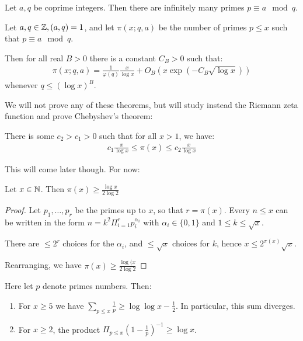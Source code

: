 \documentclass[10pt,a4paper]{article}
\begin{document}
\begin{theorem}
Let $a,q$ be coprime integers. Then there are infinitely many primes $p \equiv a \mod q$.
\end{theorem}
\begin{theorem}
Let $a,q \in \mathbb{Z}, (a,q)=1$, and let $\pi(x;q,a)$ be the number of primes $p \leq x$ such that $p \equiv a \mod q$. 

Then for all real $B>0$ there is a constant $C_B>0$ such that:
\begin{align*}
\pi(x;q,a) = \frac{1}{\varphi(q)}\frac{x}{\log x}+O_B(x \exp(-C_B\sqrt{\log x}))
\end{align*}
whenever $q \leq (\log x)^B$.
\end{theorem}
We will not prove any of these theorems, but will study instead the Riemann zeta function and prove Chebyshev's theorem:
\begin{theorem}[Chebyshev]
There is some $c_2>c_1>0$ such that for all $x>1$, we have:
\begin{align*}
c_1 \frac{x}{\log x} \leq \pi(x) \leq c_2 \frac{x}{\log x}
\end{align*}
\end{theorem}
This will come later though. For now:
\begin{lemma}
Let $x \in \mathbb{N}$. Then $\pi(x) \geq \frac{\log x}{2\log 2}$
\end{lemma}
\begin{proof}
Let $p_1, \ldots, p_r$ be the primes up to $x$, so that $r = \pi(x)$. Every $n \leq x$ can be written in the form $n = k^2 \Pi_{i=1}^r p_i^{\alpha_i}$ with $\alpha_i \in \{0,1\}$ and $1 \leq k \leq \sqrt{x}$.

There are $\leq 2^r$ choices for the $\alpha_i$, and $\leq \sqrt{x}$ choices for $k$, hence $x \leq 2^{\pi(x)} \sqrt{x}$.

Rearranging, we have $\pi(x) \geq \frac{\log(x}{2\log 2}$
\end{proof}
Here let $p$ denote primes numbers. Then:
\begin{theorem}
\item
\begin{enumerate}
\item For $x \geq 5$ we have $\sum_{p\leq x} \frac{1}{p} \geq \log\log x - \frac{1}{2}$. In particular, this sum diverges.
\item For $x \geq 2$, the product $\Pi_{p\leq x} (1-\frac{1}{p})^{-1} \geq \log x$.
\end{enumerate}
\end{theorem}
\end{document}
